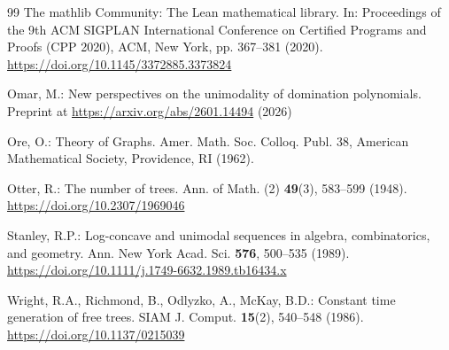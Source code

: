 \begin{thebibliography}{99}
 The mathlib Community: The Lean mathematical library. In: Proceedings of the 9th ACM SIGPLAN International Conference on Certified Programs and Proofs (CPP 2020), ACM, New York, pp. 367--381 (2020). \url{https://doi.org/10.1145/3372885.3373824}

 Omar, M.: New perspectives on the unimodality of domination polynomials. Preprint at \url{https://arxiv.org/abs/2601.14494} (2026)

 Ore, O.: Theory of Graphs. Amer. Math. Soc. Colloq. Publ. 38, American Mathematical Society, Providence, RI (1962).

 Otter, R.: The number of trees. Ann. of Math. (2) \textbf{49}(3), 583--599 (1948). \url{https://doi.org/10.2307/1969046}

 Stanley, R.P.: Log-concave and unimodal sequences in algebra, combinatorics, and geometry. Ann. New York Acad. Sci. \textbf{576}, 500--535 (1989). \url{https://doi.org/10.1111/j.1749-6632.1989.tb16434.x}

 Wright, R.A., Richmond, B., Odlyzko, A., McKay, B.D.: Constant time generation of free trees. SIAM J. Comput. \textbf{15}(2), 540--548 (1986). \url{https://doi.org/10.1137/0215039}

\end{thebibliography}
